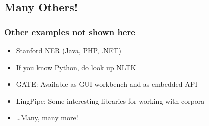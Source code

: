 \subsection{Many Others!}

\begin{frame}
\frametitle{Other examples not shown here}

\begin{itemize}
\item Stanford NER (Java, PHP, .NET)
\item If you know Python, do look up NLTK \parencite{nltk:book}
\item GATE: Available as GUI workbench and as embedded API
\item LingPipe: Some interesting libraries for working with corpora
\item \ldots Many, many more!
\end{itemize}
    


\end{frame}